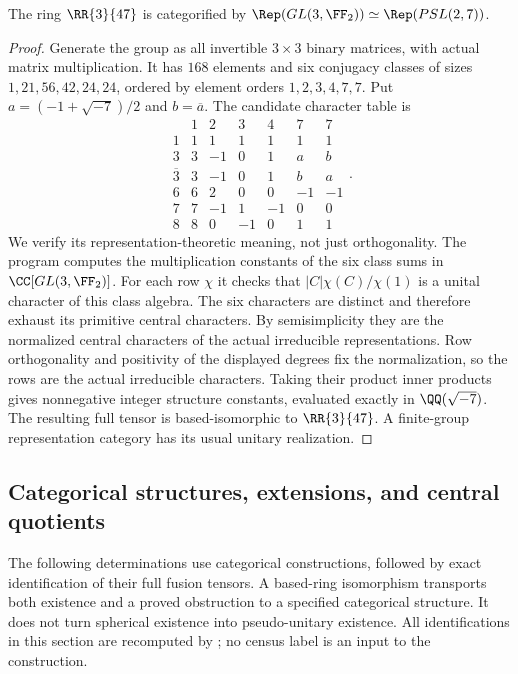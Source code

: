 \begin{proposition}\label{prop:PSLmodel}
The ring $\RR{3}{47}$ is categorified by
$\Rep(GL(3,\FF_2))\simeq\Rep(PSL(2,7))$.
\end{proposition}
\begin{proof}
Generate the group as all invertible $3\times3$ binary matrices, with
actual matrix multiplication. It has $168$ elements and six conjugacy
classes of sizes $1,21,56,42,24,24$, ordered by element orders
$1,2,3,4,7,7$. Put $a=(-1+\sqrt{-7})/2$ and $b=\overline a$.
The candidate character table is
\[
\begin{array}{c|rrrrrr}
 &1&2&3&4&7&7\\\hline
1&1&1&1&1&1&1\\
3&3&-1&0&1&a&b\\
\overline3&3&-1&0&1&b&a\\
6&6&2&0&0&-1&-1\\
7&7&-1&1&-1&0&0\\
8&8&0&-1&0&1&1
\end{array}.
\]
We verify its representation-theoretic meaning, not just orthogonality.
The program computes the multiplication constants of the six class sums
in $\CC[GL(3,\FF_2)]$. For each row $\chi$ it checks that
$|C|\chi(C)/\chi(1)$ is a unital character of this class algebra.
The six characters are distinct and therefore exhaust its primitive
central characters. By semisimplicity they are the normalized central
characters of the actual irreducible representations. Row orthogonality
and positivity of the displayed degrees fix the normalization, so the
rows are the actual irreducible characters. Taking their product inner
products gives nonnegative integer structure constants, evaluated
exactly in $\QQ(\sqrt{-7})$. The resulting full tensor is based-isomorphic
to $\RR{3}{47}$. A finite-group representation category has its usual
unitary realization.
\end{proof}

\subsection{Categorical structures, extensions, and central quotients}\label{sec:literature-models}
The following determinations use categorical constructions, followed by
exact identification of their full fusion tensors. A based-ring
isomorphism transports both existence and a proved obstruction to a
specified categorical structure. It does not turn spherical existence
into pseudo-unitary existence. All identifications in this section are
recomputed by ; no census label
is an input to the construction.

